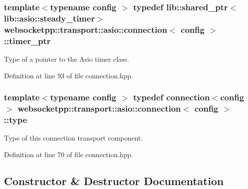 \hypertarget{classwebsocketpp_1_1transport_1_1asio_1_1connection_a96d8a6cd5cf1120208b206da109a194e}{}
\subsubsection[{timer\+\_\+ptr}]{\setlength{\rightskip}{0pt plus 5cm}template$<$typename config $>$ typedef lib\+::shared\+\_\+ptr$<${\bf lib\+::asio\+::steady\+\_\+timer}$>$ {\bf websocketpp\+::transport\+::asio\+::connection}$<$ config $>$\+::{\bf timer\+\_\+ptr}}\label{classwebsocketpp_1_1transport_1_1asio_1_1connection_a96d8a6cd5cf1120208b206da109a194e}


Type of a pointer to the Asio timer class. 



Definition at line 93 of file connection.\+hpp.

\hypertarget{classwebsocketpp_1_1transport_1_1asio_1_1connection_a8d3c48e550b2570f65cf84de034068c8}{}
\subsubsection[{type}]{\setlength{\rightskip}{0pt plus 5cm}template$<$typename config $>$ typedef {\bf connection}$<$config$>$ {\bf websocketpp\+::transport\+::asio\+::connection}$<$ config $>$\+::{\bf type}}\label{classwebsocketpp_1_1transport_1_1asio_1_1connection_a8d3c48e550b2570f65cf84de034068c8}


Type of this connection transport component. 



Definition at line 70 of file connection.\+hpp.



\subsection{Constructor \& Destructor Documentation}
\hypertarget{classwebsocketpp_1_1transport_1_1asio_1_1connection_aff25718cc376e7d473d4e46c12e22551}{}
